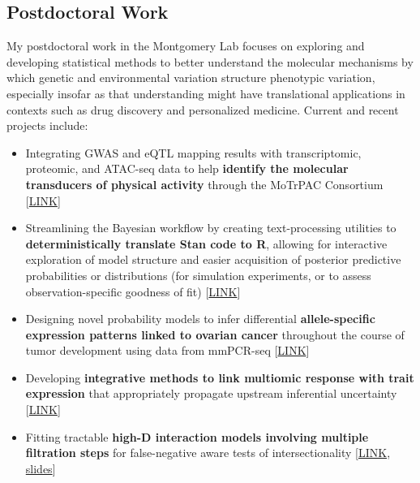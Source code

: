 \documentclass[12pt]{article}
\begin{document}
\subsection{Postdoctoral Work}

My postdoctoral work in the Montgomery Lab focuses on exploring and developing statistical methods to better understand the molecular mechanisms by which genetic and environmental variation structure phenotypic variation, especially insofar as that understanding might have translational applications in contexts such as drug discovery and personalized medicine.  Current and recent projects include:

\begin{itemize}[noitemsep]

\item Integrating GWAS and eQTL mapping results with transcriptomic, proteomic, and ATAC-seq data to help \textbf{identify the molecular transducers of physical activity} through the MoTrPAC Consortium [\href{https://github.com/NikVetr/MoTrPAC\_Complex\_Traits}{LINK}]

\item Streamlining the Bayesian workflow by creating text-processing utilities to \textbf{deterministically translate Stan code to R}, allowing for interactive exploration of model structure and easier acquisition of posterior predictive probabilities or distributions (for simulation experiments, or to assess observation-specific goodness of fit) [\href{ https://github.com/NikVetr/montgomery\_lab/blob/master/parse\_Stan.R }{LINK}]

\item Designing novel probability models to infer differential \textbf{allele-specific expression patterns linked to ovarian cancer} throughout the course of tumor development using data from mmPCR-seq [\href{https://github.com/nsabell/egtex-ase}{LINK}]

\item Developing \textbf{integrative methods to link multiomic response with trait expression} that appropriately propagate upstream inferential uncertainty [\href{https://github.com/NikVetr/papers/blob/main/twas-method/proposed\_TWAS\_method.pdf}{LINK}]

\item Fitting tractable \textbf{high-D interaction models involving multiple filtration steps} for false-negative aware tests of intersectionality  [\href{https://github.com/NikVetr/minor\_scripts/blob/master/postdoc/pipeline\_problems.R}{LINK}, \href{https://docs.google.com/presentation/d/15VzbHIvp0oMQNcg4B82MdzEfSzld8TqD/}{slides}]


\end{itemize}
\end{document}
